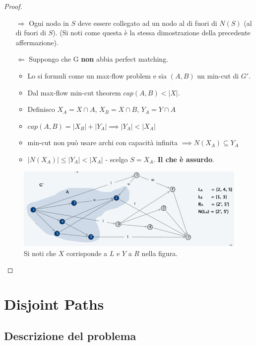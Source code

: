 \begin{proof}\
	\begin{itemize}
		\item[$\Rightarrow$] Ogni nodo in $S$ deve essere
			collegato ad un nodo al di fuori di $N(S)$ (al di fuori di $S$). (Si
			noti come questa è la stessa dimostrazione della precedente
			affermazione).
		\item[$\Leftarrow$] Suppongo che G \textbf{non} abbia perfect matching.
			\begin{itemize}
				\item Lo si formuli come un max-flow problem e sia $(A,B)$ un
				      min-cut di $G'$.
				\item Dal max-flow min-cut theorem $cap(A,B) < |X|$.
				\item Definisco $X_A = X \cap A$, $X_B = X \cap B$, $Y_A = Y \cap A$
				\item $cap(A,B) = |X_B| + |Y_A| \implies |Y_A| < |X_A|$
				\item min-cut non può usare archi con capacità infinita
				      $\implies N(X_A) \subseteq Y_A$
				\item $|N(X_A)| \le |Y_A| < |X_A|$ - scelgo $S = X_A$.
				      \textbf{Il che è assurdo}.
			\end{itemize}
	\end{itemize}

	\begin{figure}[H]
		\centering
		\includegraphics[width = 12 cm]{capitoli/network_flow/imgs/bipartite3.png}
		\caption{Si noti che $X$ corrisponde a $L$ e $Y$ a $R$ nella figura.}
	\end{figure}
\end{proof}

\section{Disjoint Paths}

\subsection{Descrizione del problema}

